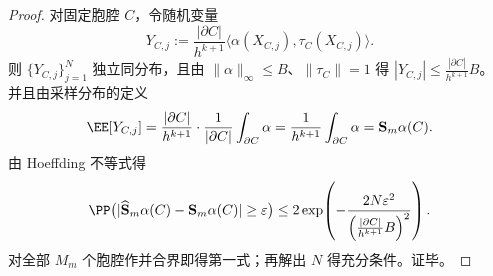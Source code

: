 \begin{proof}
对固定胞腔 \(C\)，令随机变量
\[
Y_{C,j}:=\frac{|\partial C|}{h^{k+1}}\langle \alpha(X_{C,j}),\tau_C(X_{C,j})\rangle.
\]
则 \(\{Y_{C,j}\}_{j=1}^N\) 独立同分布，且由 \(\|\alpha\|_\infty\le B\)、\(\|\tau_C\|=1\) 得
\(
|Y_{C,j}|\le \frac{|\partial C|}{h^{k+1}}B
\)。
并且由采样分布的定义
\[
\EE[Y_{C,j}]
=\frac{|\partial C|}{h^{k+1}}\cdot \frac1{|\partial C|}\int_{\partial C}\alpha
=\frac1{h^{k+1}}\int_{\partial C}\alpha
=\mathbf S_m\alpha(C).
\]
由 Hoeffding 不等式得
\[
\PP\bigl(|\widehat{\mathbf S}_m\alpha(C)-\mathbf S_m\alpha(C)|\ge\varepsilon\bigr)
\le
2\exp\!\left(
-\frac{2N\varepsilon^2}{\left(\frac{|\partial C|}{h^{k+1}}B\right)^2}
\right).
\]
对全部 \(M_m\) 个胞腔作并合界即得第一式；再解出 \(N\) 得充分条件。证毕。
\end{proof}
